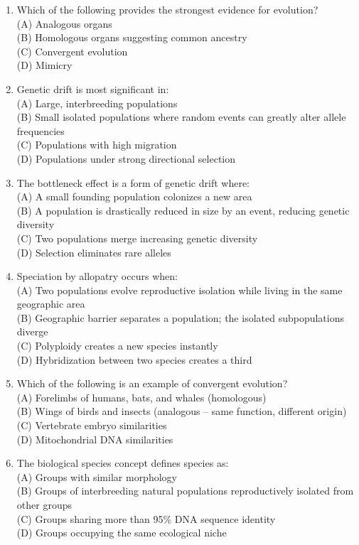 \documentclass{article}
\begin{document}
\begin{enumerate}[label=Q\arabic*.]
\item Which of the following provides the strongest evidence for evolution?
\\(A) Analogous organs
\\(B) Homologous organs suggesting common ancestry
\\(C) Convergent evolution
\\(D) Mimicry

\item Genetic drift is most significant in:
\\(A) Large, interbreeding populations
\\(B) Small isolated populations where random events can greatly alter allele frequencies
\\(C) Populations with high migration
\\(D) Populations under strong directional selection

\item The bottleneck effect is a form of genetic drift where:
\\(A) A small founding population colonizes a new area
\\(B) A population is drastically reduced in size by an event, reducing genetic diversity
\\(C) Two populations merge increasing genetic diversity
\\(D) Selection eliminates rare alleles

\item Speciation by allopatry occurs when:
\\(A) Two populations evolve reproductive isolation while living in the same geographic area
\\(B) Geographic barrier separates a population; the isolated subpopulations diverge
\\(C) Polyploidy creates a new species instantly
\\(D) Hybridization between two species creates a third

\item Which of the following is an example of convergent evolution?
\\(A) Forelimbs of humans, bats, and whales (homologous)
\\(B) Wings of birds and insects (analogous -- same function, different origin)
\\(C) Vertebrate embryo similarities
\\(D) Mitochondrial DNA similarities

\item The biological species concept defines species as:
\\(A) Groups with similar morphology
\\(B) Groups of interbreeding natural populations reproductively isolated from other groups
\\(C) Groups sharing more than 95\% DNA sequence identity
\\(D) Groups occupying the same ecological niche


\end{enumerate}
\end{document}
